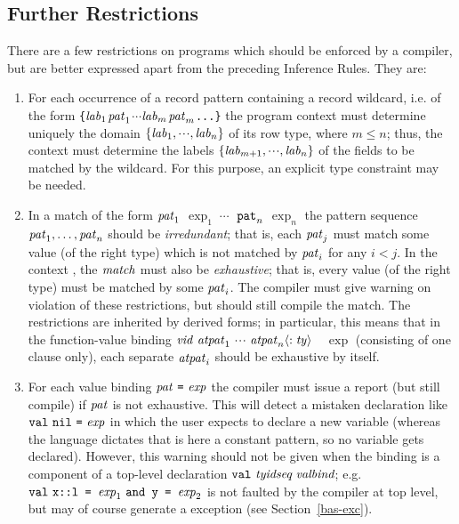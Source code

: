 \subsection{Further Restrictions}
\label{further-restrictions-sec}
There are a few restrictions on programs which should be enforced by a
compiler, but are better expressed apart from the preceding
Inference Rules.  They are:
\begin{enumerate}
\item For each occurrence of a record pattern containing a record wildcard,
i.e. of the form
\verb+{+${\it lab}_1$\ml{=}$\pat_1$\ml{,}$\cdots$\ml{,}${\it lab}_m$\ml{=}$\pat_m$\ml{,}\verb+...}+
the program context must determine uniquely the domain
$\{{\it lab}_1,\cdots,{\it lab}_n\}$
of its row type, where $m\leq n$; thus, the context must
determine the labels $\{{\it lab}_{m+1},\cdots,{\it lab}_n\}$ of the fields
to be matched by the wildcard. For this purpose, an explicit type
constraint may be needed.

\item In a match of the form 
${\it pat}_1$ \ml{=>} $\exp_1$\ml{|}$\;\cdots\;$\ml{|} ${\tt pat}_n$ \ml{=>} $\exp_n$ 
the pattern sequence $\pat_1,\ldots,\pat_n$ should be {\sl
irredundant}; that is, each $\pat_j$ must match some value (of the
right type) which is not matched by $\pat_i$ for any $i<j$.  In the
context {\fnexp}, the $\match$ must also be {\sl exhaustive}; that is,
every value (of the right type) must be matched by some $\pat_i$.  The
compiler must give warning on violation of these restrictions, but
should still compile the match.  The restrictions are inherited by
derived forms; in particular, this means that in the function-value
binding {$\vid\ \atpat_1\ \cdots\ \atpat_n\langle :
\ty\rangle$\ \ml{=}\ $\exp$} (consisting of one clause only), each
separate $\atpat_i$ should be exhaustive by itself.

\item   For each value binding   $\pat\ \mbox{\ml{=}}\ \exp$
        the compiler must issue a report (but still compile) if $\pat$
        is not exhaustive.  This will detect a mistaken declaration
        like $\VAL\ \ml{nil}\ \mbox{\ml{=}}\ \exp$ in which the user
        expects to declare a new variable  (whereas the
        language dictates that  is here a constant pattern, so
        no variable gets declared).  However, this warning should not
        be given when the binding is a component of a top-level
        declaration $\valdec$; e.g.  $\VAL\ \mbox{\ml{x::l = }}\exp_1\
        \mbox{\ml{\AND\ y = }}\exp_2$ is not faulted by the compiler
        at top level, but may of course generate a \ml{Bind} exception
        (see Section~\ref{bas-exc}).
\end{enumerate}

